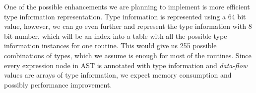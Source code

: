         One of the possible enhancements we are 
        planning to implement is more efficient 
        type information representation. Type information 
        is represented using a 64 bit value, however, 
        we can go even further and represent the type 
        information with 8 bit number, which will be an index 
        into a table with all the possible type information 
        instances for one routine. This would give us 255 
        possible combinations of types, which we assume is 
        enough for most of the routines. Since every expression 
        node in AST is annotated with type information and 
        \emph{data-flow} values are arrays of 
        type information, we expect memory consumption 
        and possibly performance improvement.
        
        